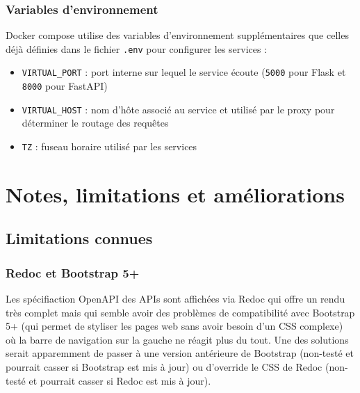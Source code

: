 \subsubsection{Variables d'environnement}
Docker compose utilise des variables d'environnement supplémentaires que celles déjà définies dans le fichier \texttt{.env} pour configurer les services :

\begin{itemize}
    \item[$\bullet$] \texttt{VIRTUAL\_PORT} : port interne sur lequel le service écoute (\texttt{5000} pour Flask et \texttt{8000} pour FastAPI)
    \item[$\bullet$] \texttt{VIRTUAL\_HOST} : nom d'hôte associé au service et utilisé par le proxy pour déterminer le routage des requêtes
    \item[$\bullet$] \texttt{TZ} : fuseau horaire utilisé par les services
\end{itemize}
\section{Notes, limitations et améliorations}
\subsection{Limitations connues}
\subsubsection{Redoc et Bootstrap 5+}
Les spécifiaction OpenAPI des APIs sont affichées via Redoc qui offre un rendu très complet mais qui semble avoir des problèmes de compatibilité avec Bootstrap 5+ (qui permet de styliser les pages web sans avoir besoin d'un CSS complexe) où la barre de navigation sur la gauche ne réagit plus du tout. Une des solutions serait apparemment de passer à une version antérieure de Bootstrap (non-testé et pourrait casser si Bootstrap est mis à jour) ou d'override le CSS de Redoc (non-testé et pourrait casser si Redoc est mis à jour).

